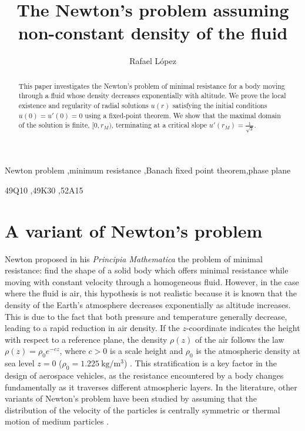 \documentclass[preprint,11pt]{elsarticle}
\theoremstyle{definition}
\begin{document}
\begin{frontmatter}
 
\title{The Newton's problem assuming non-constant density of the fluid}
 
\author{Rafael L\'opez} %
\address{Department of Geometry and Topology. University of Granada. 18071 Granada, Spain}

\begin{abstract}
This paper investigates the  Newton's problem of minimal resistance for a body moving through a fluid whose density decreases exponentially with altitude.   We prove the local existence and regularity of radial solutions $u(r)$ satisfying the initial conditions $u(0)=u'(0)=0$ using a fixed-point theorem. We show that the maximal domain of the solution is finite, $[0, r_M)$,  terminating at a critical slope $u'(r_M) = \frac{1}{\sqrt{3}}$.  
\end{abstract}
 
\begin{keyword} Newton problem \sep minimum resistance \sep Banach fixed point theorem\sep phase plane


 \MSC 49Q10 \sep 49K30 \sep 52A15 

\end{keyword}

\end{frontmatter}

 
 
 
 

 
\section{A variant of Newton's problem}


Newton proposed in his {\it Principia Mathematica} the problem of minimal resistance: find the shape of a solid body which offers minimal resistance while moving with constant velocity through a homogeneous fluid. However, in the case where the fluid is   air, this hypothesis is not realistic because it is known that the density of the Earth's atmosphere decreases exponentially   as altitude increases. This is due to the fact that both pressure and temperature generally decrease, leading to a rapid reduction in air density. If the $z$-coordinate indicates the height with respect to a reference plane, the density $\rho(z)$ of the air follows the law $\rho(z)=\rho_0e^{-c z}$, where $c>0$ is a scale height and $\rho_0$ is the atmospheric density at sea level $z=0$ ($\rho_0 = 1.225~\mathrm{kg/m^3}$) \cite{an,ah,wa}.  This stratification is a key factor in the design of aerospace vehicles, as the resistance encountered by a body changes fundamentally as it traverses different atmospheric layers. In the literature, other variants of Newton's problem have been studied by assuming that the distribution of the velocity of the particles is centrally symmetric \cite{pt} or   thermal motion of medium particles \cite[Ch. 3]{pl}.
\end{document}

